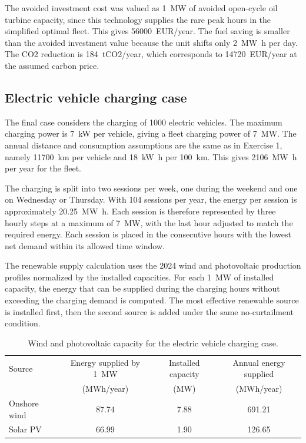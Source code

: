 \documentclass[a4paper]{report}
\begin{document}
The avoided investment cost was valued as \SI{1}{\mega\watt} of avoided open-cycle oil turbine capacity, since this technology supplies the rare peak hours in the simplified optimal fleet. This gives \SI{56000}{EUR/year}. The fuel saving is smaller than the avoided investment value because the unit shifts only \SI{2}{\mega\watt\hour} per day. The CO2 reduction is \SI{184}{tCO2/year}, which corresponds to \SI{14720}{EUR/year} at the assumed carbon price.

\subsection{Electric vehicle charging case}

The final case considers the charging of 1000 electric vehicles. The maximum charging power is \SI{7}{\kilo\watt} per vehicle, giving a fleet charging power of \SI{7}{\mega\watt}. The annual distance and consumption assumptions are the same as in Exercise 1, namely \SI{11700}{\kilo\meter} per vehicle and \SI{18}{\kilo\watt\hour} per \SI{100}{\kilo\meter}. This gives \SI{2106}{\mega\watt\hour} per year for the fleet.

The charging is split into two sessions per week, one during the weekend and one on Wednesday or Thursday. With 104 sessions per year, the energy per session is approximately \SI{20.25}{\mega\watt\hour}. Each session is therefore represented by three hourly steps at a maximum of \SI{7}{\mega\watt}, with the last hour adjusted to match the required energy. Each session is placed in the consecutive hours with the lowest net demand within its allowed time window.

The renewable supply calculation uses the 2024 wind and photovoltaic production profiles normalized by the installed capacities. For each \SI{1}{\mega\watt} of installed capacity, the energy that can be supplied during the charging hours without exceeding the charging demand is computed. The most effective renewable source is installed first, then the second source is added under the same no-curtailment condition.

\begin{table}[H]
  \centering
  \caption{Wind and photovoltaic capacity for the electric vehicle charging case.}
  \label{tab:exercise4-renewable-ev}
  \begin{tabular}{lccc}
    \toprule
    Source & Energy supplied by \SI{1}{\mega\watt} & Installed capacity & Annual energy supplied \\
    & (MWh/year) & (MW) & (MWh/year) \\
    \midrule
    Onshore wind & 87.74 & 7.88 & 691.21 \\
    Solar PV & 66.99 & 1.90 & 126.65 \\
    \bottomrule
  \end{tabular}
\end{table}
\end{document}

